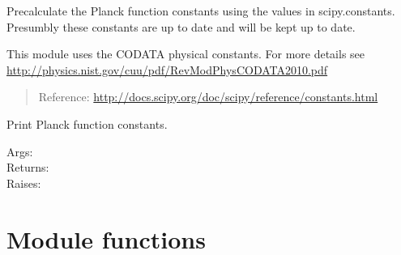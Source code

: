 \documentclass[a4paper,10pt,english]{sphinxmanual}
\begin{document}
\begin{fulllineitems}
\label{ryplanck:pyradi.ryplanck.PlanckConstants}
Precalculate the Planck function constants using the values in
scipy.constants.  Presumbly these constants are up to date and
will be kept up to date.

This module uses the CODATA physical constants. For more details see
\href{http://physics.nist.gov/cuu/pdf/RevModPhysCODATA2010.pdf}{http://physics.nist.gov/cuu/pdf/RevModPhysCODATA2010.pdf}
\begin{quote}

Reference: \href{http://docs.scipy.org/doc/scipy/reference/constants.html}{http://docs.scipy.org/doc/scipy/reference/constants.html}
\end{quote}

\begin{fulllineitems}
\label{ryplanck:pyradi.ryplanck.PlanckConstants.printConstants}
Print Planck function constants.
\begin{description}
\item[{Args:}] \leavevmode
{}

\item[{Returns:}] \leavevmode
{}

\item[{Raises:}] \leavevmode
{}

\end{description}

\end{fulllineitems}


\end{fulllineitems}



\section{Module functions}
\label{ryplanck:module-functions}
\end{document}
